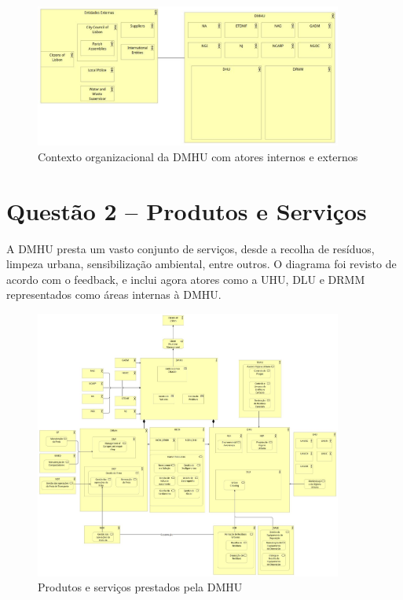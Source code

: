 \documentclass[12pt,a4paper,final]{article}
\begin{document}
    \begin{figure}[H]
        \centering
        \includegraphics[width=0.9\textwidth]{Q1a - DMHU Context.jpg}
        \caption{Contexto organizacional da DMHU com atores internos e externos}
        \label{fig:q1-contexto}
    \end{figure}

    \section*{Questão 2 – Produtos e Serviços}

    A DMHU presta um vasto conjunto de serviços, desde a recolha de resíduos, limpeza urbana, sensibilização ambiental, entre outros. O diagrama foi revisto de acordo com o feedback, e inclui agora atores como a UHU, DLU e DRMM representados como áreas internas à DMHU.

    \begin{figure}[H]
        \centering
        \includegraphics[width=0.9\textwidth]{Q2 - Business Products and services.jpg}
        \caption{Produtos e serviços prestados pela DMHU}
        \label{fig:q2-servicos}
    \end{figure}
\end{document}
